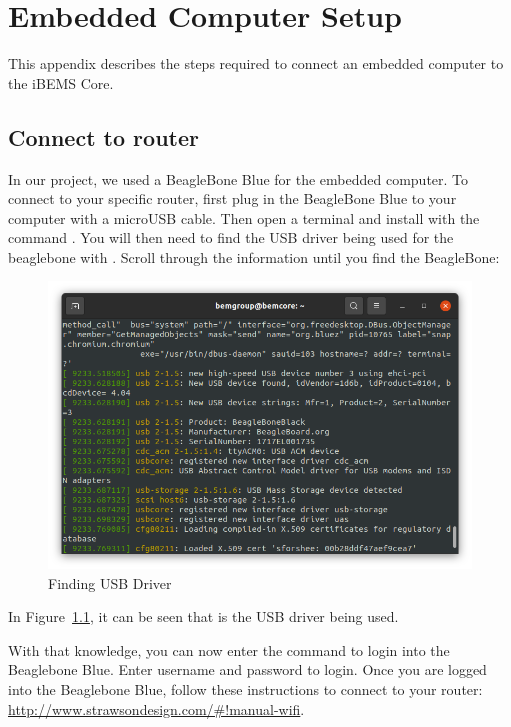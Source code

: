 \chapter{Embedded Computer Setup}
\label{ap: appendixD}

This appendix describes the steps required to connect an embedded computer to the iBEMS Core. 

\section{Connect to router}
In our project, we used a BeagleBone Blue for the embedded computer. To connect to your specific router, first plug in the BeagleBone Blue to your computer with a microUSB cable. Then open a terminal and install  with the command . You will then need to find the USB driver being used for the beaglebone with . Scroll through the information until you find the BeagleBone:

\begin{figure}[H]
\centering
\includegraphics[scale=0.4]{figs/beaglebone/findUSBdriver.png}
\caption{Finding USB Driver}
\label{fig:bb_findUSB}
\end{figure}

In Figure~\ref{fig:bb_findUSB}, it can be seen that  is the USB driver being used.

With that knowledge, you can now enter the command  to login into the Beaglebone Blue. Enter username  and password  to login.
\medbreak
Once you are logged into the Beaglebone Blue, follow these instructions to connect to your router:
\href{http://www.strawsondesign.com/\#!manual-wifi}{http://www.strawsondesign.com/\#!manual-wifi}.

